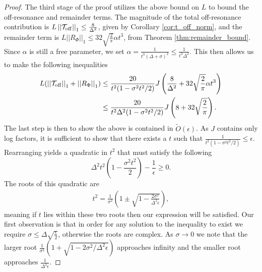 \documentclass{article}
\newcommand{\off}{\rm off}
\newcommand{\norm}[1]{\left|\left| #1 \right|\right|}
\newcommand{\bigotilde}[1]{\widetilde{O} \left( #1 \right)}
\begin{document}
\begin{proof}
 The third stage of the proof utilizes the above bound on $L$ to bound the  off-resonance and remainder terms. The magnitude of the total off-resonance contribution is $L \norm{\mathcal{T}_{\off}}_1 \le \frac{8 }{\Delta^2}$, given by Corollary \ref{cor:t_off_norm}, and the remainder term is $L \norm{R_{\Phi}}_1 \le 32 \sqrt{\frac{2}{\pi}} \alpha t^3$, from Theorem \ref{thm:remainder_bound}. %
 Since $\alpha$ is still a free parameter, we %
 set $\alpha = \frac{1}{t^3(\Delta + \sigma)^2} \le \frac{1}{t^3 \Delta^2}$. This then allows us to make the following inequalities
 \begin{align}
     L(\norm{\mathcal{T}_{\off}}_1 + \norm{R_{\Phi}}_1) &\le \frac{20}{t^2(1 - \sigma^2 t^2 / 2)}J \left( \frac{8}{\Delta^2} + 32 \sqrt{\frac{2}{\pi}} \alpha t^3 \right) \\
    &\le \frac{20}{t^2 \Delta^2 (1 - \sigma^2 t^2 / 2)}J \left( 8 + 32 \sqrt{\frac{2}{\pi}}\right). \label{eq:single_qubit_tmp_2}
 \end{align}
The last step is then to show the above is contained in $\bigotilde{\epsilon}$. As $J$ contains only log factors, it is sufficient to show that there exists a $t$ such that $\frac{1}{t^2(1 - \sigma^2 t^2 / 2)} \le \epsilon$. Rearranging yields a quadratic in $t^2$ that must satisfy the following
\begin{equation}
    \Delta^2 t^2 \left(1 - \frac{\sigma^2 t^2}{2}\right) - \frac{1}{\epsilon} \ge 0. \label{eq:single_qubit_tmp_3}
\end{equation}
The roots of this quadratic are
\begin{align}
    t^2 = \frac{1}{\sigma^2}\left(1 \pm \sqrt{1 - \frac{2 \sigma^2}{\Delta^2 \epsilon}} \right),
\end{align}
meaning if $t$ lies within these two roots then our expression will be satisfied. Our first observation is that in order for any solution to the inequality to exist we require $\sigma \le \Delta \sqrt{\frac{\epsilon}{2}}$, otherwise the roots are complex. As $\sigma \to 0$ we note that the larger root $\frac{1}{\sigma^2}(1 + \sqrt{1 - 2 \sigma^2 / \Delta^2 \epsilon})$ approaches infinity and the smaller root approaches $\frac{1}{\Delta^2 \epsilon}$.


\end{proof}
\end{document}
